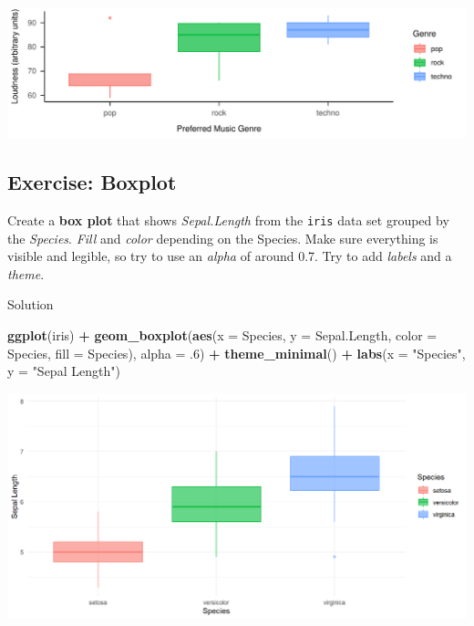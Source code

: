 \documentclass[
]{book}
\newenvironment{Shaded}{\begin{snugshade}}{\end{snugshade}}
\newcommand{\AttributeTok}[1]{\textcolor[rgb]{0.13,0.29,0.53}{#1}}
\newcommand{\DecValTok}[1]{\textcolor[rgb]{0.00,0.00,0.81}{#1}}
\newcommand{\FunctionTok}[1]{\textcolor[rgb]{0.13,0.29,0.53}{\textbf{#1}}}
\newcommand{\NormalTok}[1]{#1}
\newcommand{\SpecialCharTok}[1]{\textcolor[rgb]{0.81,0.36,0.00}{\textbf{#1}}}
\newcommand{\StringTok}[1]{\textcolor[rgb]{0.31,0.60,0.02}{#1}}
\begin{document}
\includegraphics{_main_files/figure-html/boxex-1.pdf}

\subsection{Exercise: Boxplot}\label{exercise-boxplot}

Create a \textbf{box plot} that shows \emph{Sepal.Length} from the \texttt{iris} data set grouped by the \emph{Species}.
\emph{Fill} and \emph{color} depending on the Species.
Make sure everything is visible and legible, so try to use an \emph{alpha} of around 0.7.
Try to add \emph{labels} and a \emph{theme}.

Solution

\begin{Shaded}
\begin{Highlighting}[]
\FunctionTok{ggplot}\NormalTok{(iris) }\SpecialCharTok{+} 
  \FunctionTok{geom\_boxplot}\NormalTok{(}\FunctionTok{aes}\NormalTok{(}\AttributeTok{x =}\NormalTok{ Species, }\AttributeTok{y =}\NormalTok{ Sepal.Length,}
                   \AttributeTok{color =}\NormalTok{ Species, }\AttributeTok{fill =}\NormalTok{ Species), }\AttributeTok{alpha =}\NormalTok{ .}\DecValTok{6}\NormalTok{) }\SpecialCharTok{+}
  \FunctionTok{theme\_minimal}\NormalTok{() }\SpecialCharTok{+} \FunctionTok{labs}\NormalTok{(}\AttributeTok{x =} \StringTok{"Species"}\NormalTok{, }\AttributeTok{y =} \StringTok{"Sepal Length"}\NormalTok{)}
\end{Highlighting}
\end{Shaded}

\begin{flushleft}\includegraphics{_main_files/figure-html/bpsol-1} \end{flushleft}
\end{document}
